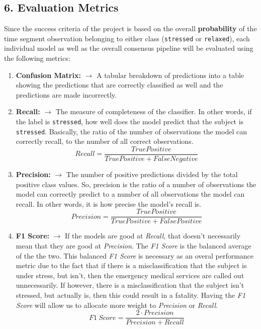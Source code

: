 \documentclass{scrreprt}
\begin{document}
\subsection{6. Evaluation Metrics}\label{evaluation-metrics}

Since the success criteria of the project is based on the overall
\textbf{probability} of the time segment observation belonging to either
class (\texttt{stressed} or \texttt{relaxed}), each individual model as
well as the overall consensus pipeline will be evaluated using the
following metrics:

\begin{enumerate}
\def\labelenumi{\arabic{enumi}.}
\item
  \textbf{Confusion Matrix:} $\rightarrow$ A tabular breakdown of
  predictions into a table showing the predictions that are correctly
  classified as well and the predictions are made incorrectly.
\item
  \textbf{Recall:} $\rightarrow$ The measure of completeness of the
  classifier. In other words, if the label is \texttt{stressed}, how
  well does the model predict that the subject is \texttt{stressed}.
  Basically, the ratio of the number of observations the model can
  correctly recall, to the number of all correct observations. \[
  Recall = \frac{True Positive}{True Positive + False Negative}
  \]
\item
  \textbf{Precision:} $\rightarrow$ The number of positive predictions
  divided by the total positive class values. So, precision is the ratio
  of a number of observations the model can correctly predict to a
  number of all observations the model can recall. In other words, it is
  how precise the model's recall is. \[
  Precision = \frac{True Positive}{True Positive + False Positive}
  \]
\item
  \textbf{F1 Score:} $\rightarrow$ If the models are good at
  \emph{Recall}, that doesn't necessarily mean that they are good at
  \emph{Precision}. The \emph{F1 Score} is the balanced average of the
  the two. This balanced \emph{F1 Score} is necessary as an overal
  performance metric due to the fact that if there is a
  misclassification that the subject is under stress, but isn't, then
  the emergency medical services are called out unnecessarily. If
  however, there is a misclassification that the subject isn't stressed,
  but actually is, then this could result in a fatality. Having the
  \emph{F1 Score} will allow us to allocate more weight to
  \emph{Precision} or \emph{Recall}. \[
  F1 \ Score = \frac{2 \cdot Precision}{Precision + Recall}
  \]
\end{enumerate}
\end{document}
